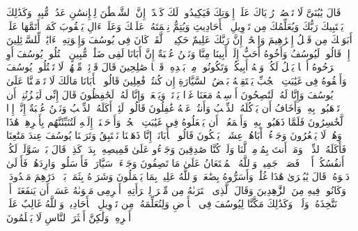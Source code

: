 \startbuffer[\q:12:5]
قَالَ یَٰبُنَیَّ لَا تَقۡصُصۡ رُءۡیَاكَ عَلَىٰۤ إِخۡوَتِكَ فَیَكِیدُوا۟ لَكَ كَیۡدًاۖ إِنَّ ٱلشَّیۡطَٰنَ لِلۡإِنسَٰنِ عَدُوࣱّ مُّبِینࣱ%
\stopbuffer
\startbuffer[\q:12:6]
وَكَذَٰلِكَ یَجۡتَبِیكَ رَبُّكَ وَیُعَلِّمُكَ مِن تَأۡوِیلِ ٱلۡأَحَادِیثِ وَیُتِمُّ نِعۡمَتَهُۥ عَلَیۡكَ وَعَلَىٰۤ ءَالِ یَعۡقُوبَ كَمَاۤ أَتَمَّهَا عَلَىٰۤ أَبَوَیۡكَ مِن قَبۡلُ إِبۡرَٰهِیمَ وَإِسۡحَٰقَۚ إِنَّ رَبَّكَ عَلِیمٌ حَكِیمࣱ%
\stopbuffer
\startbuffer[\q:12:7]
۞ لَّقَدۡ كَانَ فِی یُوسُفَ وَإِخۡوَتِهِۦۤ ءَایَٰتࣱ لِّلسَّاۤئِلِینَ%
\stopbuffer
\startbuffer[\q:12:8]
إِذۡ قَالُوا۟ لَیُوسُفُ وَأَخُوهُ أَحَبُّ إِلَىٰۤ أَبِینَا مِنَّا وَنَحۡنُ عُصۡبَةٌ إِنَّ أَبَانَا لَفِی ضَلَٰلࣲ مُّبِینٍ%
\stopbuffer
\startbuffer[\q:12:9]
ٱقۡتُلُوا۟ یُوسُفَ أَوِ ٱطۡرَحُوهُ أَرۡضࣰا یَخۡلُ لَكُمۡ وَجۡهُ أَبِیكُمۡ وَتَكُونُوا۟ مِنۢ بَعۡدِهِۦ قَوۡمࣰا صَٰلِحِینَ%
\stopbuffer
\startbuffer[\q:12:10]
قَالَ قَاۤئِلࣱ مِّنۡهُمۡ لَا تَقۡتُلُوا۟ یُوسُفَ وَأَلۡقُوهُ فِی غَیَٰبَتِ ٱلۡجُبِّ یَلۡتَقِطۡهُ بَعۡضُ ٱلسَّیَّارَةِ إِن كُنتُمۡ فَٰعِلِینَ%
\stopbuffer
\startbuffer[\q:12:11]
قَالُوا۟ یَٰۤأَبَانَا مَالَكَ لَا تَأۡمَـ۫نَّا عَلَىٰ یُوسُفَ وَإِنَّا لَهُۥ لَنَٰصِحُونَ%
\stopbuffer
\startbuffer[\q:12:12]
أَرۡسِلۡهُ مَعَنَا غَدࣰا یَرۡتَعۡ وَیَلۡعَبۡ وَإِنَّا لَهُۥ لَحَٰفِظُونَ%
\stopbuffer
\startbuffer[\q:12:13]
قَالَ إِنِّی لَیَحۡزُنُنِیۤ أَن تَذۡهَبُوا۟ بِهِۦ وَأَخَافُ أَن یَأۡكُلَهُ ٱلذِّئۡبُ وَأَنتُمۡ عَنۡهُ غَٰفِلُونَ%
\stopbuffer
\startbuffer[\q:12:14]
قَالُوا۟ لَئِنۡ أَكَلَهُ ٱلذِّئۡبُ وَنَحۡنُ عُصۡبَةٌ إِنَّاۤ إِذࣰا لَّخَٰسِرُونَ%
\stopbuffer
\startbuffer[\q:12:15]
فَلَمَّا ذَهَبُوا۟ بِهِۦ وَأَجۡمَعُوۤا۟ أَن یَجۡعَلُوهُ فِی غَیَٰبَتِ ٱلۡجُبِّۚ وَأَوۡحَیۡنَاۤ إِلَیۡهِ لَتُنَبِّئَنَّهُم بِأَمۡرِهِمۡ هَٰذَا وَهُمۡ لَا یَشۡعُرُونَ%
\stopbuffer
\startbuffer[\q:12:16]
وَجَاۤءُوۤ أَبَاهُمۡ عِشَاۤءࣰ یَبۡكُونَ%
\stopbuffer
\startbuffer[\q:12:17]
قَالُوا۟ یَٰۤأَبَانَاۤ إِنَّا ذَهَبۡنَا نَسۡتَبِقُ وَتَرَكۡنَا یُوسُفَ عِندَ مَتَٰعِنَا فَأَكَلَهُ ٱلذِّئۡبُۖ وَمَاۤ أَنتَ بِمُؤۡمِنࣲ لَّنَا وَلَوۡ كُنَّا صَٰدِقِینَ%
\stopbuffer
\startbuffer[\q:12:18]
وَجَاۤءُو عَلَىٰ قَمِیصِهِۦ بِدَمࣲ كَذِبࣲۚ قَالَ بَلۡ سَوَّلَتۡ لَكُمۡ أَنفُسُكُمۡ أَمۡرࣰاۖ فَصَبۡرࣱ جَمِیلࣱۖ وَٱللَّهُ ٱلۡمُسۡتَعَانُ عَلَىٰ مَا تَصِفُونَ%
\stopbuffer
\startbuffer[\q:12:19]
وَجَاۤءَتۡ سَیَّارَةࣱ فَأَرۡسَلُوا۟ وَارِدَهُمۡ فَأَدۡلَىٰ دَلۡوَهُۥۖ قَالَ یَٰبُشۡرَىٰ هَٰذَا غُلَٰمࣱۚ وَأَسَرُّوهُ بِضَٰعَةࣰۚ وَٱللَّهُ عَلِیمُۢ بِمَا یَعۡمَلُونَ%
\stopbuffer
\startbuffer[\q:12:20]
وَشَرَوۡهُ بِثَمَنِۭ بَخۡسࣲ دَرَٰهِمَ مَعۡدُودَةࣲ وَكَانُوا۟ فِیهِ مِنَ ٱلزَّٰهِدِینَ%
\stopbuffer
\startbuffer[\q:12:21]
وَقَالَ ٱلَّذِی ٱشۡتَرَىٰهُ مِن مِّصۡرَ لِٱمۡرَأَتِهِۦۤ أَكۡرِمِی مَثۡوَىٰهُ عَسَىٰۤ أَن یَنفَعَنَاۤ أَوۡ نَتَّخِذَهُۥ وَلَدࣰاۚ وَكَذَٰلِكَ مَكَّنَّا لِیُوسُفَ فِی ٱلۡأَرۡضِ وَلِنُعَلِّمَهُۥ مِن تَأۡوِیلِ ٱلۡأَحَادِیثِۚ وَٱللَّهُ غَالِبٌ عَلَىٰۤ أَمۡرِهِۦ وَلَٰكِنَّ أَكۡثَرَ ٱلنَّاسِ لَا یَعۡلَمُونَ%
